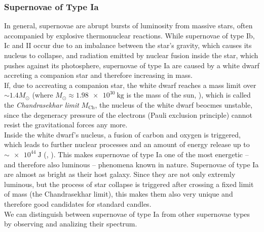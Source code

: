 \subsubsection{Supernovae of Type Ia}

In general, supernovae are abrupt bursts of luminosity from massive stars, often accompanied by explosive thermonuclear reactions.
While supernovae of type Ib, Ic and II occur due to an imbalance between the star's gravity, which causes its nucleus to collapse, and radiation emitted by nuclear fusion inside the star, which pushes against its photosphere, supernovae of type Ia are caused by a white dwarf accreting a companion star and therefore increasing in mass. \\
If, due to accreating a companion star, the white dwarf reaches a mass limit over $\sim 1.4 M_{\odot}$ (where $M_{\odot} \approx \SI{1.98e+30}{\kilogram}$ is the mass of the sun, \cite[p.~48]{Bartelmann2019}), which is called the \textit{Chandrasekhar limit} $M_{\text{Ch}}$, the nucleus of the white dwarf beocmes unstable, since the degeneracy pressure of the electrons (Pauli exclusion principle) cannot resist the gravitational forces any more. \\
Inside the white dwarf's nucleus, a fusion of carbon and oxygen is triggered, which leads to further nuclear processes and an amount of energy release up to $\sim \SI{e+44}{\joule}$ (\cite[p.~295]{Maguire2017}, \cite[p.~321]{Spatschek2017}).
This makes supernovae of type Ia one of the most energetic -- and therefore also luminous -- phenomena known in nature. Supernovae of type Ia are almost as bright as their host galaxy. 
Since they are not only extremly luminous, but the process of star collapse is triggered after crossing a fixed limit of mass (the Chandrasekhar limit), this makes them also very unique and therefore good candidates for standard candles. \\
\noindent We can distinguish between supernovae of type Ia from other supernovae types by observing and analizing their spectrum.

